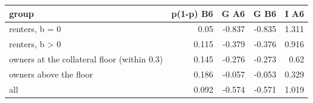 \begin{tabular}{lrrrr}
\toprule
group & p(1-p) B6 & G A6 & G B6 & I A6 \\
\midrule
renters, b = 0 & 0.05 & -0.837 & -0.835 & 1.311 \\
renters, b > 0 & 0.115 & -0.379 & -0.376 & 0.916 \\
owners at the collateral floor (within 0.3) & 0.145 & -0.276 & -0.273 & 0.62 \\
owners above the floor & 0.186 & -0.057 & -0.053 & 0.329 \\
all & 0.092 & -0.574 & -0.571 & 1.019 \\
\bottomrule
\end{tabular}
